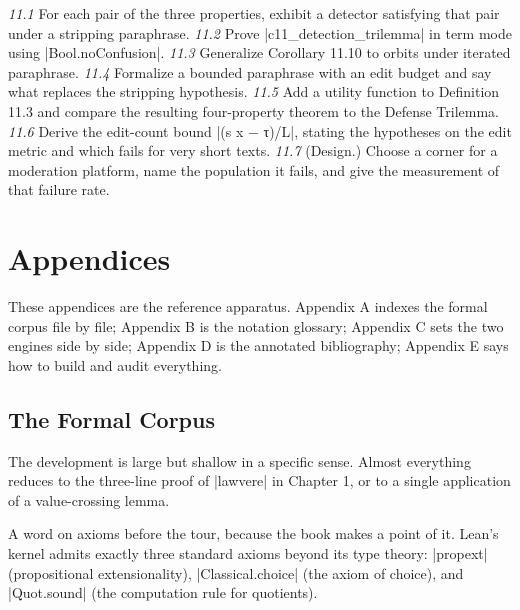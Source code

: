 \documentclass{memoir}
\begin{document}
\emph{11.1} For each pair of the three properties, exhibit a detector satisfying that pair
under a stripping paraphrase.
\emph{11.2} Prove \LeanVerb|c11_detection_trilemma| in term mode using \LeanVerb|Bool.noConfusion|.
\emph{11.3} Generalize Corollary 11.10 to orbits under iterated paraphrase.
\emph{11.4} Formalize a bounded paraphrase with an edit budget and say what replaces the
stripping hypothesis.
\emph{11.5} Add a utility function to Definition 11.3 and compare the resulting four-property
theorem to the Defense Trilemma.
\emph{11.6} Derive the edit-count bound \LeanVerb|(s x − τ)/L|, stating the hypotheses on the edit
metric and which fails for very short texts.
\emph{11.7} (Design.) Choose a corner for a moderation platform, name the population it
fails, and give the measurement of that failure rate.





\chapter{Appendices}\label{Two--Schemas--of--Impossibility-005F-005F-005F--Machine--Checked--Limits--of--Trustworthy--Machine--Learning-005F-005F-005F--and--Why--They--Tighten--with--Capability----Appendices}

These appendices are the reference apparatus. Appendix A indexes the formal corpus
file by file; Appendix B is the notation glossary; Appendix C sets the two engines
side by side; Appendix D is the annotated bibliography; Appendix E says how to build
and audit everything.



\section{The Formal Corpus}\label{Two--Schemas--of--Impossibility-005F-005F-005F--Machine--Checked--Limits--of--Trustworthy--Machine--Learning-005F-005F-005F--and--Why--They--Tighten--with--Capability----Appendices----The--Formal--Corpus}

The development is large but shallow in a specific sense. Almost everything reduces
to the three-line proof of \LeanVerb|lawvere| in Chapter 1, or to a single application of a
value-crossing lemma.

A word on axioms before the tour, because the book makes a point of it. Lean's
kernel admits exactly three standard axioms beyond its type theory: \LeanVerb|propext|
(propositional extensionality), \LeanVerb|Classical.choice| (the axiom of choice), and
\LeanVerb|Quot.sound| (the computation rule for quotients).
\end{document}
